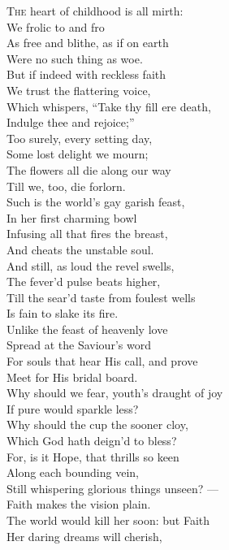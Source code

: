 \textsc{The} heart of childhood is all mirth: \\
 We frolic to and fro \\
 As free and blithe, as if on earth \\
 Were no such thing as woe. \\
  But if indeed with reckless faith \\
 We trust the flattering voice, \\
 Which whispers, “Take thy fill ere death, \\
 Indulge thee and rejoice;” \\
  Too surely, every setting day, \\
 Some lost delight we mourn; \\
 The flowers all die along our way \\
 Till we, too, die forlorn. \\
  Such is the world’s gay garish feast, \\
 In her first charming bowl \\
 Infusing all that fires the breast, \\
 And cheats the unstable soul. \\
  And still, as loud the revel swells, \\
 The fever’d pulse beats higher, \\
 Till the sear’d taste from foulest wells \\
 Is fain to slake its fire. \\
  Unlike the feast of heavenly love \\
 Spread at the Saviour’s word \\
 For souls that hear His call, and prove \\
 Meet for His bridal board. \\
  Why should we fear, youth’s draught of joy \\
 If pure would sparkle less? \\
 Why should the cup the sooner cloy, \\
 Which God hath deign’d to bless? \\
  For, is it Hope, that thrills so keen \\
 Along each bounding vein, \\
 Still whispering glorious things unseen? — \\
 Faith makes the vision plain. \\
  The world would kill her soon: but Faith \\
 Her daring dreams will cherish, \\
